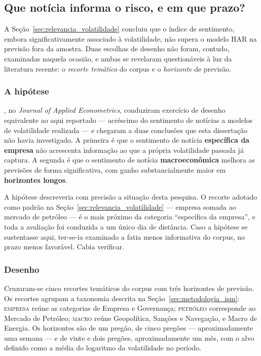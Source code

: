 \subsection{Que notícia informa o risco, e em que prazo?}
\label{sec:macro_empresa}

A Seção~\ref{sec:relevancia_volatilidade} concluiu que o índice de sentimento, embora
significativamente associado à volatilidade, não supera o modelo HAR na previsão fora da amostra.
Duas escolhas de desenho não foram, contudo, examinadas naquela ocasião, e ambas se revelaram
questionáveis à luz da literatura recente: o \emph{recorte temático} do corpus e o \emph{horizonte}
de previsão.

\subsubsection{A hipótese}

, no \textit{Journal of Applied Econometrics}, conduziram
exercício de desenho equivalente ao aqui reportado --- acréscimo do sentimento de notícias a modelos
de volatilidade realizada --- e chegaram a duas conclusões que esta dissertação não havia
investigado. A primeira é que o sentimento de notícia \textbf{específica da empresa} não acrescenta
informação ao que a própria volatilidade passada já captura. A segunda é que o sentimento de notícia
\textbf{macroeconômica} melhora as previsões de forma significativa, com ganho substancialmente
maior em \textbf{horizontes longos}.

A hipótese descreveria com precisão a situação desta pesquisa. O recorte adotado como padrão na
Seção~\ref{sec:relevancia_volatilidade} --- empresa somada ao mercado de petróleo --- é o mais
próximo da categoria ``específica da empresa'', e toda a avaliação foi conduzida a um único dia de
distância. Caso a hipótese se sustentasse aqui, ter-se-ia examinado a fatia menos informativa do
corpus, no prazo menos favorável. Cabia verificar.

\subsubsection{Desenho}

Cruzaram-se cinco recortes temáticos do corpus com três horizontes de previsão. Os recortes agrupam
a taxonomia descrita na Seção~\ref{sec:metodologia_ism}: \textsc{empresa} reúne as categorias de
Empresa e Governança; \textsc{petróleo} corresponde ao Mercado de Petróleo; \textsc{macro} reúne
Geopolítica, Sanções e Navegação, e Macro de Energia. Os horizontes são de um pregão, de cinco
pregões --- aproximadamente uma semana --- e de vinte e dois pregões, aproximadamente um mês, com o
alvo definido como a média do logaritmo da volatilidade no período.

